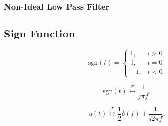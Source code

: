\begin{example}
\end{example}

\subsubsection{Non-Ideal Low Pass Filter}
\begin{example}
\end{example}

\subsection{Sign Function}
\begin{definition}
    \[
\text{sgn}(t) = 
\begin{cases}
    1, & t > 0 \\
    0, & t = 0 \\
    -1, & t < 0
\end{cases}
\]
\end{definition}

\begin{definition}
    \begin{equation*}
        \text{sgn}(t) \overset{\mathcal{F}}{\leftrightarrow} \frac{1}{j \pi f}.
    \end{equation*}
\end{definition}

\begin{definition}
    \begin{equation*}
        u(t) \overset{\mathcal{F}}{\leftrightarrow} \frac{1}{2} \delta(f) + \frac{1}{j 2 \pi f}.
    \end{equation*}
\end{definition}

